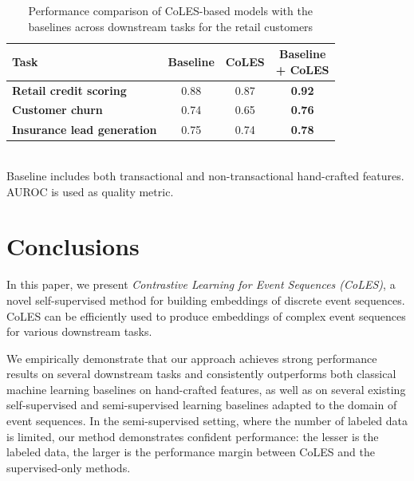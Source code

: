 \documentclass[sigconf, anonymous]{acmart}
\begin{document}
\begin{table}
    \centering
    \caption{
        Performance comparison of CoLES-based models with the baselines across downstream
        tasks for the retail customers
    }
    \begin{tabularx}{\linewidth}{Xccc}
        \toprule
            \textbf{Task }
            & \textbf{Baseline}
            & \textbf{CoLES}
            & \makecell{\textbf{Baseline}\\\textbf{+ CoLES}}
            \\
        \midrule
            \textbf{Retail credit scoring} & 0.88 & 0.87 & \textbf{0.92} \\
            \textbf{Customer churn} & 0.74 & 0.65 & \textbf{0.76} \\
            \textbf{Insurance lead generation} & 0.75 & 0.74 & \textbf{0.78} \\ %
        \bottomrule
    \end{tabularx}%
    \\
    \small{
        Baseline includes both transactional and non-transactional hand-crafted
        features. AUROC is used as quality metric.
    }
    \label{tab-internal-person}
\end{table}


\section{Conclusions} \label{sec-conclusions}

In this paper, we present \emph{Contrastive Learning for Event Sequences (CoLES)}, a novel
self-supervised method for building embeddings of discrete event sequences. CoLES can be
efficiently used to produce embeddings of complex event sequences for various downstream
tasks.

We empirically demonstrate that our approach achieves strong performance results on
several downstream tasks and consistently outperforms both classical machine learning
baselines on hand-crafted features, as well as on several existing self-supervised and
semi-supervised learning baselines adapted to the domain of event sequences.
% 
In the semi-supervised setting, where the number of labeled data is limited, our method
demonstrates confident performance: the lesser is the labeled data, the larger is
the performance margin between CoLES and the supervised-only methods.
\end{document}
